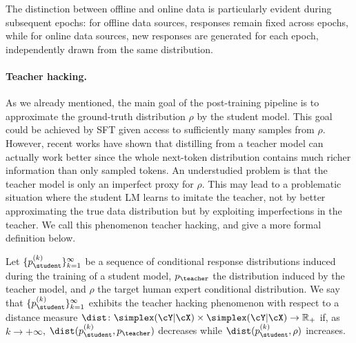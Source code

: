 The distinction between offline and online data is particularly evident during subsequent epochs: for offline data sources, responses remain fixed across epochs, while for online data sources, new responses are generated for each epoch, independently drawn from the same distribution.



\paragraph{Teacher hacking.} 
As we already mentioned, the main goal of the post-training pipeline is to approximate the ground-truth distribution $\rho$ by the student model. This goal could be achieved by SFT given access to sufficiently many samples from $\rho$. However, recent works have shown that distilling from a teacher model can actually work better since the whole next-token distribution contains much richer information than only sampled tokens. An understudied problem is that the teacher model is only an imperfect proxy for $\rho$. This may lead to a problematic situation where the student LM learns to imitate the teacher, not by better approximating the true data distribution but by exploiting imperfections in the teacher.
We call this phenomenon teacher hacking, and give a more formal definition below.
\begin{tcolorbox}[colback=colorblue,
    colframe=black,
    arc=4pt,
    boxsep=0.3pt,
]%
\begin{definition}\label{def:teacher_hacking}
    Let $\{p_{\student}^{(k)}\}_{k=1}^\infty$ be a sequence of conditional response distributions induced during the training of a student model, $p_{\teacher}$ the distribution induced by the teacher model, and $\rho$ the target human expert conditional distribution. We say that $\{p_{\student}^{(k)}\}_{k=1}^\infty$ exhibits the teacher hacking phenomenon with respect to a distance measure $\dist \colon \simplex(\cY | \cX) \times \simplex(\cY | \cX) \to \mathbb{R}_{+}$ if, as $k \to +\infty$, $\dist(p_{\student}^{(k)}, p_{\teacher})$ decreases while $\dist(p_{\student}^{(k)}, \rho)$ increases.
\end{definition}
\end{tcolorbox}

